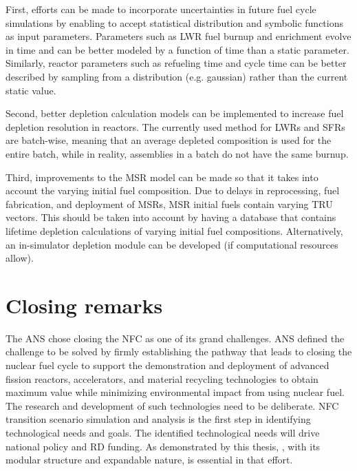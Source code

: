 First, efforts can be made to incorporate
uncertainties in future fuel cycle simulations by enabling
\Cyclus to accept statistical distribution and symbolic
functions as input parameters. Parameters such as \gls{LWR} fuel
burnup and enrichment evolve in time and can be better modeled
by a function of time than a static parameter. Similarly, reactor parameters
such as refueling time and cycle time can be better described by sampling
from a distribution (e.g. gaussian) rather than the current static
value.

Second, better depletion calculation models can be implemented to increase
fuel depletion resolution in reactors. The currently used method for
\glspl{LWR} and \glspl{SFR} are batch-wise, meaning that an average
depleted composition is used for the entire batch, while in reality,
assemblies in a batch do not have the same burnup.

Third, improvements to the \gls{MSR} model can be made so that it
takes into account the varying initial fuel composition. Due to delays
in reprocessing, fuel fabrication, and deployment of \glspl{MSR}, \gls{MSR}
initial fuels contain varying \gls{TRU} vectors. This should be taken into
account by having a database that contains lifetime depletion calculations
of varying initial fuel compositions. Alternatively, an in-simulator
depletion module can be developed (if computational resources allow).


\section{Closing remarks}
The \gls{ANS} chose closing the \gls{NFC} as one of its grand challenges. \gls{ANS}
defined the challenge to be solved by firmly establishing the pathway that leads to closing
the nuclear fuel cycle to support the demonstration and deployment of
advanced fission reactors, accelerators, and material recycling technologies
to obtain maximum value while minimizing environmental impact 
from using nuclear fuel. The research and development of such technologies
need to be deliberate. \gls{NFC} transition scenario simulation and 
analysis is the first step in identifying technological needs
and goals. The identified technological needs will drive national
policy and \gls{RD} funding. As demonstrated by this thesis, \Cyclus, with its modular structure and expandable nature, is essential in that effort.

